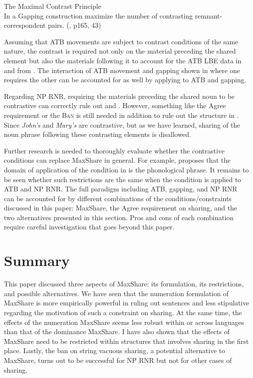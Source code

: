 \documentclass[output=paper]{langscibook}
\begin{document}
\ea 
	\label{shenMCP}
	The Maximal Contrast Principle\\
	In a Gapping construction maximize the number of contrasting remnant-correspondent pairs. (\citealt{Hartmann:2000}, p165, 43)
	\z 


Assuming that ATB movements are subject to contrast conditions of the same nature, the contrast is required not only on the material preceding the shared element but also the materials following it to account for the ATB LBE data in  and  from \cite{Citko:2006}. The interaction of ATB movement and gapping shown in  where one requires the other can be accounted for as well by applying  to ATB and gapping. 

Regarding NP RNR, requiring the materials preceding the shared noun to be contrastive can correctly rule out  and . However, something like the Agree requirement or the \textsc{Ban} is still needed in addition to rule out the structure in . Since \textit{John's} and \textit{Mary's} are contrastive, but as we have learned, sharing of the noun phrase following these contrasting elements is disallowed. 

Further research is needed to thoroughly evaluate whether the contrastive conditions can replace MaxShare in general. For example, \cite{Hartmann:2000} proposes that the domain of application of the condition in  is the phonological phrase. It remains to be seen whether such restrictions are the same when the condition is applied to ATB and NP RNR.  The full paradigm including ATB, gapping, and NP RNR can be accounted for by different combinations of the conditions/constraints discussed in this paper: MaxShare, the Agree requirement on sharing, and the two alternatives presented in this section. Pros and cons of each combination require careful investigation that goes beyond this paper.

\section{Summary}
\label{shensect:summary}

This paper discussed three aspects of MaxShare: its formulation, its restrictions, and possible alternatives. We have seen that the numeration formulation of MaxShare is more empirically powerful in ruling out sentences and less stipulative regarding the motivation of such a constraint on sharing. At the same time, the effects of the numeration MaxShare seems less robust within or across languages than that of the dominance MaxShare. I have also shown that the effects of MaxShare need to be restricted within structures that involves sharing in the first place. Lastly, the ban on string vacuous sharing, a potential alternative to MaxShare, turns out to be successful for NP RNR but not for other cases of sharing. 
\end{document}
